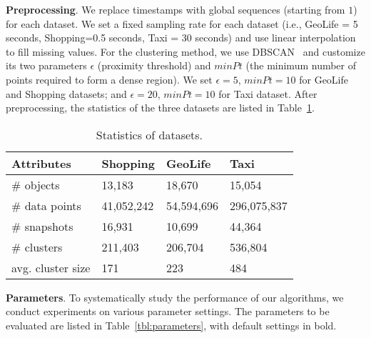 \textbf{Preprocessing}. We replace timestamps with global sequences (starting from $1$) for each dataset. 
We set a fixed sampling rate for each dataset (i.e., GeoLife = 5 seconds, Shopping=0.5 seconds, Taxi = 30 seconds)
and use linear interpolation to fill missing values.
For the clustering method, we use DBSCAN~\cite{ester1996density} and customize its two parameters $\epsilon$ (proximity threshold) and $minPt$ (the minimum number of points required to form a dense region). We set $\epsilon=5$, $minPt=10$ for GeoLife and Shopping datasets; and $\epsilon=20$, $minPt=10$ for Taxi dataset. 
After preprocessing, the statistics of the three datasets are listed in Table~\ref{exp:dataset}. 

\begin{table} [h]
\center
\caption{Statistics of datasets.}
\vspace{-0.5em}
\label{exp:dataset}
\begin{tabular}{|l|l|l|l|}
\hline
 \textbf{Attributes}& \textbf{Shopping} &  \textbf{GeoLife} &  \textbf{Taxi} \\ 
\hline 
\# objects  & 13,183 & 18,670 & 15,054\\ 
\hline
\# data points  & 41,052,242 & 54,594,696 & 296,075,837\\ 
\hline
\# snapshots  & 16,931 & 10,699 & 44,364\\ 
\hline
\# clusters  & 211,403  & 206,704& 536,804\\
\hline
avg. cluster size  & 171 & 223 & 484\\
\hline
\end{tabular}
\end{table}


\textbf{Parameters}. To systematically study the performance of
our algorithms, we conduct experiments on various parameter settings. The parameters to be evaluated are listed in Table~\ref{tbl:parameters}, with default settings in bold. 

